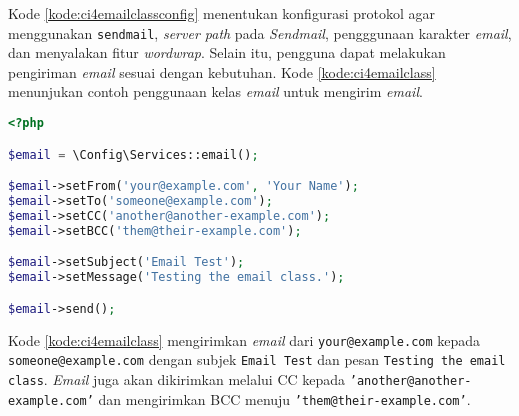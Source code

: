 Kode \ref{kode:ci4emailclassconfig} menentukan konfigurasi protokol agar menggunakan \texttt{sendmail}, \textit{server path} pada \textit{Sendmail}, pengggunaan karakter \textit{email}, dan menyalakan fitur \textit{wordwrap}. Selain itu, pengguna dapat melakukan pengiriman \textit{email} sesuai dengan kebutuhan. Kode \ref{kode:ci4emailclass} menunjukan contoh penggunaan kelas \textit{email} untuk mengirim \textit{email}.
\begin{lstlisting}[language=PHP, caption=Contoh kode untuk melakukan pengiriman \textit{email}. ,label=kode:ci4emailclass]
<?php

$email = \Config\Services::email();

$email->setFrom('your@example.com', 'Your Name');
$email->setTo('someone@example.com');
$email->setCC('another@another-example.com');
$email->setBCC('them@their-example.com');

$email->setSubject('Email Test');
$email->setMessage('Testing the email class.');

$email->send();
\end{lstlisting}
Kode \ref{kode:ci4emailclass} mengirimkan \textit{email} dari \texttt{your@example.com} kepada \texttt{someone@example.com} dengan subjek \texttt{Email Test} dan pesan \texttt{Testing the email class}. \textit{Email} juga akan dikirimkan melalui CC kepada \texttt{'another@another-example.com'} dan mengirimkan BCC menuju \texttt{'them@their-example.com'}.
